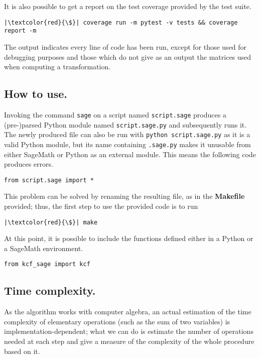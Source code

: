It is also possible to get a report on the test coverage provided by the test suite.
\begin{verbatim}
|\textcolor{red}{\$}| coverage run -m pytest -v tests && coverage report -m
\end{verbatim}

The output indicates every line of code has been run, except for those used for debugging purposes and those
which do not give as an output the matrices used when computing a transformation.

\subsection*{How to use.}
Invoking the command \texttt{sage} on a script named \texttt{script.sage} produces a (pre-)parsed
Python module named \texttt{script.sage.py} and subsequently runs it. The newly produced file can also
be run with \texttt{python script.sage.py} as it is a valid Python module, but its name containing
\texttt{.sage.py} makes it unusable from either SageMath or Python as an external module. This means the
following code produces errors.
\begin{verbatim}
from script.sage import *
\end{verbatim}

This problem can be solved by renaming the resulting file, as in the \textbf{Makefile} provided; thus, the first step to
use the provided code is to run
\begin{verbatim}
|\textcolor{red}{\$}| make
\end{verbatim}

At this point, it is possible to include the functions defined either in a Python or a SageMath environment.
\begin{verbatim}
from kcf_sage import kcf
\end{verbatim}

\subsection*{Time complexity.}
As the algorithm works with computer algebra, an actual estimation of the time complexity of elementary operations
(such as the sum of two variables) is implementation-dependent; what we can do is estimate the number of operations
needed at each step and give a measure of the complexity of the whole procedure based on it.

